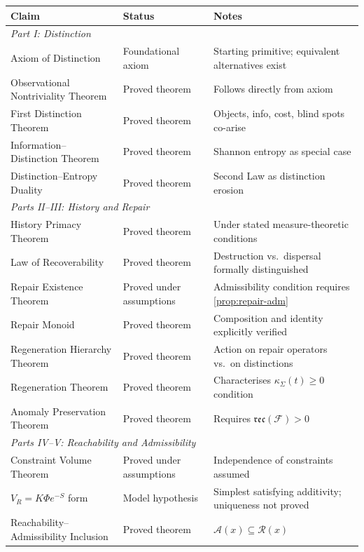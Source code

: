 \documentclass[12pt,twoside,openright]{book}
\newcommand{\reco}{\mathfrak{rec}}
\begin{document}
\begin{center}
\small
\setlength{\tabcolsep}{4pt}
\begin{tabular}{p{5.5cm}lp{5cm}}
\toprule
\textbf{Claim} & \textbf{Status} & \textbf{Notes} \\
\midrule
\multicolumn{3}{l}{\itshape Part I: Distinction} \\[2pt]
Axiom of Distinction & Foundational axiom &
  Starting primitive; equivalent alternatives exist \\
Observational Nontriviality Theorem & Proved theorem &
  Follows directly from axiom \\
First Distinction Theorem & Proved theorem &
  Objects, info, cost, blind spots co-arise \\
Information--Distinction Theorem & Proved theorem &
  Shannon entropy as special case \\
Distinction--Entropy Duality & Proved theorem &
  Second Law as distinction erosion \\
\midrule
\multicolumn{3}{l}{\itshape Parts II--III: History and Repair} \\[2pt]
History Primacy Theorem & Proved theorem &
  Under stated measure-theoretic conditions \\
Law of Recoverability & Proved theorem &
  Destruction vs.\ dispersal formally distinguished \\
Repair Existence Theorem & Proved under assumptions &
  Admissibility condition requires \cref{prop:repair-adm} \\
Repair Monoid & Proved theorem &
  Composition and identity explicitly verified \\
Regeneration Hierarchy Theorem & Proved theorem &
  Action on repair operators vs.\ on distinctions \\
Regeneration Theorem & Proved theorem &
  Characterises $\kappa_\Sigma(t) \ge 0$ condition \\
Anomaly Preservation Theorem & Proved theorem &
  Requires $\reco(\mathcal{F}) > 0$ \\
\midrule
\multicolumn{3}{l}{\itshape Parts IV--V: Reachability and Admissibility} \\[2pt]
Constraint Volume Theorem & Proved under assumptions &
  Independence of constraints assumed \\
$V_R = K\Phi e^{-S}$ form & Model hypothesis &
  Simplest satisfying additivity; uniqueness not proved \\
Reachability--Admissibility Inclusion & Proved theorem &
  $\mathcal{A}(x) \subseteq \mathcal{R}(x)$ \\

\end{tabular}
\end{center}
\end{document}
